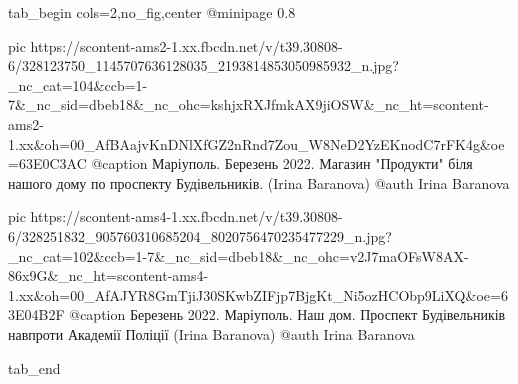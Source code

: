  
 
 
 
 

\begin{center}
\begin{minipage}{\textwidth}

\ifcmt
  tab_begin cols=2,no_fig,center
    @minipage 0.8

     pic https://scontent-ams2-1.xx.fbcdn.net/v/t39.30808-6/328123750_1145707636128035_2193814853050985932_n.jpg?_nc_cat=104&ccb=1-7&_nc_sid=dbeb18&_nc_ohc=kshjxRXJfmkAX9jiOSW&_nc_ht=scontent-ams2-1.xx&oh=00_AfBAajvKnDNlXfGZ2nRnd7Zou_W8NeD2YzEKnodC7rFK4g&oe=63E0C3AC
     @caption Маріуполь. Березень 2022. Магазин "Продукти" біля нашого дому по проспекту Будівельників. (Irina Baranova)
     @auth Irina Baranova

     pic https://scontent-ams4-1.xx.fbcdn.net/v/t39.30808-6/328251832_905760310685204_8020756470235477229_n.jpg?_nc_cat=102&ccb=1-7&_nc_sid=dbeb18&_nc_ohc=v2J7maOFsW8AX-86x9G&_nc_ht=scontent-ams4-1.xx&oh=00_AfAJYR8GmTjiJ30SKwbZIFjp7BjgKt_Ni5ozHCObp9LiXQ&oe=63E04B2F
     @caption Березень 2022. Маріуполь. Наш дом. Проспект Будівельників навпроти Академії Поліції (Irina Baranova)
     @auth Irina Baranova

  tab_end
\fi
\end{minipage}
\end{center}
